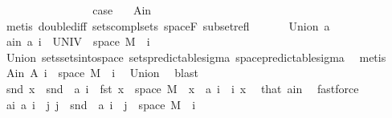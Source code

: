 \begin{isabellebody}
\ \ \isamarkupfalse%
\isanewline
\ \ \ \ \isamarkupfalse%
\ {}\isanewline
\ \ \ \ \isamarkupfalse%
\ \isamarkupfalse%
\ {\isacharquery}{\kern0pt}case\ \isamarkupfalse%
\ {\isacharasterisk}{\kern0pt}\ A{\isacharunderscore}{\kern0pt}in\ \isamarkupfalse%
\ {\isacharparenleft}{\kern0pt}metis\ double{\isacharunderscore}{\kern0pt}diff\ sets{\isachardot}{\kern0pt}compl{\isacharunderscore}{\kern0pt}sets\ space{\isacharunderscore}{\kern0pt}F\ subset{\isacharunderscore}{\kern0pt}refl{\isacharparenright}{\kern0pt}\isanewline
\ \ \isacommand{{\isacharbraceright}{\kern0pt}}\isamarkupfalse%
\isanewline
{}\isamarkupfalse%
\isanewline
\ \ \isamarkupfalse%
\ {\isacharparenleft}{\kern0pt}Union\ a{\isacharparenright}{\kern0pt}\isanewline
\ \ \isamarkupfalse%
\ a{\isacharunderscore}{\kern0pt}in{\isacharcolon}{\kern0pt}\ {\isachardoublequoteopen}a\ i\ {\isasymsubseteq}\ UNIV\ {\isasymtimes}\ space\ M{\isachardoublequoteclose}\ \ i\ \isamarkupfalse%
\ Union{\isacharparenleft}{\kern0pt}{}{\isacharparenright}{\kern0pt}\ sets{\isachardot}{\kern0pt}sets{\isacharunderscore}{\kern0pt}into{\isacharunderscore}{\kern0pt}space\ sets{\isacharunderscore}{\kern0pt}predictable{\isacharunderscore}{\kern0pt}sigma\ space{\isacharunderscore}{\kern0pt}predictable{\isacharunderscore}{\kern0pt}sigma\ \isamarkupfalse%
\ metis\isanewline
\ \ \isamarkupfalse%
\ A{\isacharunderscore}{\kern0pt}in{\isacharcolon}{\kern0pt}\ {\isachardoublequoteopen}A\ i\ {\isasymsubseteq}\ space\ M{\isachardoublequoteclose}\ \ i\ \isamarkupfalse%
\ Union{\isacharparenleft}{\kern0pt}{}{\isacharparenright}{\kern0pt}\ \isamarkupfalse%
\ blast\isanewline
\ \ \isamarkupfalse%
\ {\isachardoublequoteopen}snd\ x\ {\isasymin}\ snd\ {\isacharbackquote}{\kern0pt}\ {\isacharparenleft}{\kern0pt}a\ i\ {\isasyminter}\ {\isacharparenleft}{\kern0pt}{\isacharbraceleft}{\kern0pt}fst\ x{\isacharbraceright}{\kern0pt}\ {\isasymtimes}\ space\ M{\isacharparenright}{\kern0pt}{\isacharparenright}{\kern0pt}{\isachardoublequoteclose}\ \ {\isachardoublequoteopen}x\ {\isasymin}\ a\ i{\isachardoublequoteclose}\ \ i\ x\ \isamarkupfalse%
\ that\ a{\isacharunderscore}{\kern0pt}in\ \isamarkupfalse%
\ fastforce\isanewline
\ \ \isamarkupfalse%
\ a{\isacharunderscore}{\kern0pt}i{\isacharcolon}{\kern0pt}\ {\isachardoublequoteopen}a\ i\ {\isacharequal}{\kern0pt}\ {\isacharparenleft}{\kern0pt}{\isasymUnion}j{\isachardot}{\kern0pt}\ {\isacharbraceleft}{\kern0pt}j{\isacharbraceright}{\kern0pt}\ {\isasymtimes}\ {\isacharparenleft}{\kern0pt}snd\ {\isacharbackquote}{\kern0pt}\ {\isacharparenleft}{\kern0pt}a\ i\ {\isasyminter}\ {\isacharparenleft}{\kern0pt}{\isacharbraceleft}{\kern0pt}j{\isacharbraceright}{\kern0pt}\ {\isasymtimes}\ space\ M{\isacharparenright}{\kern0pt}{\isacharparenright}{\kern0pt}{\isacharparenright}{\kern0pt}{\isacharparenright}{\kern0pt}{\isachardoublequoteclose}\ \ i\ \isamarkupfalse%

\end{isabellebody}
